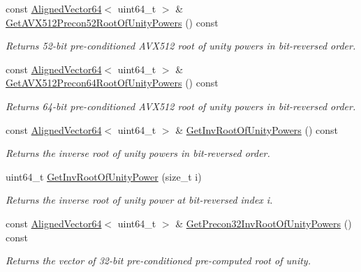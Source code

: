 \begin{DoxyCompactItemize}
const \hyperlink{namespaceintel_1_1hexl_afbdf0d2cc4209ee547a88ff22a02801b}{Aligned\+Vector64}$<$ uint64\+\_\+t $>$ \& \hyperlink{classintel_1_1hexl_1_1NTT_aca9903ac08ed7e06d343f85a0ced8b04}{Get\+A\+V\+X512\+Precon52\+Root\+Of\+Unity\+Powers} () const
\begin{DoxyCompactList}\small\item\em Returns 52-\/bit pre-\/conditioned A\+V\+X512 root of unity powers in bit-\/reversed order. \end{DoxyCompactList}\item 
const \hyperlink{namespaceintel_1_1hexl_afbdf0d2cc4209ee547a88ff22a02801b}{Aligned\+Vector64}$<$ uint64\+\_\+t $>$ \& \hyperlink{classintel_1_1hexl_1_1NTT_afb5b2c6cd1135f708c5e8a4e97d6f7da}{Get\+A\+V\+X512\+Precon64\+Root\+Of\+Unity\+Powers} () const
\begin{DoxyCompactList}\small\item\em Returns 64-\/bit pre-\/conditioned A\+V\+X512 root of unity powers in bit-\/reversed order. \end{DoxyCompactList}\item 
const \hyperlink{namespaceintel_1_1hexl_afbdf0d2cc4209ee547a88ff22a02801b}{Aligned\+Vector64}$<$ uint64\+\_\+t $>$ \& \hyperlink{classintel_1_1hexl_1_1NTT_a509f384895cf97ef9cd2edd2902eb82a}{Get\+Inv\+Root\+Of\+Unity\+Powers} () const
\begin{DoxyCompactList}\small\item\em Returns the inverse root of unity powers in bit-\/reversed order. \end{DoxyCompactList}\item 
uint64\+\_\+t \hyperlink{classintel_1_1hexl_1_1NTT_a7dd5b59ed992c5466099999ce1eb15d6}{Get\+Inv\+Root\+Of\+Unity\+Power} (size\+\_\+t i)
\begin{DoxyCompactList}\small\item\em Returns the inverse root of unity power at bit-\/reversed index i. \end{DoxyCompactList}\item 
const \hyperlink{namespaceintel_1_1hexl_afbdf0d2cc4209ee547a88ff22a02801b}{Aligned\+Vector64}$<$ uint64\+\_\+t $>$ \& \hyperlink{classintel_1_1hexl_1_1NTT_a70d5480692fcd13418ae7f4c38345770}{Get\+Precon32\+Inv\+Root\+Of\+Unity\+Powers} () const
\begin{DoxyCompactList}\small\item\em Returns the vector of 32-\/bit pre-\/conditioned pre-\/computed root of unity. \end{DoxyCompactList}\item 

\end{DoxyCompactItemize}
